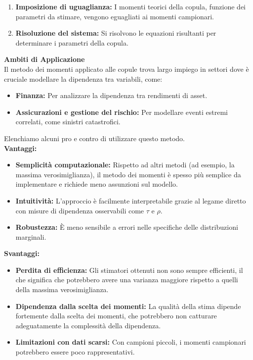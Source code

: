 \documentclass[a4paper,12pt]{article}
\begin{document}
\begin{itemize}
\begin{enumerate}[label=\arabic*.]
		\item \textbf{Imposizione di uguaglianza:} I momenti teorici della copula, funzione dei parametri da stimare, vengono eguagliati ai momenti campionari.
		
		\item \textbf{Risoluzione del sistema:} Si risolvono le equazioni risultanti per determinare i parametri della copula.
	\end{enumerate}
	
	\textbf{Ambiti di Applicazione}\\
	Il metodo dei momenti applicato alle copule trova largo impiego in settori dove è cruciale modellare la dipendenza tra variabili, come:
	\begin{itemize}
		\item \textbf{Finanza:} Per analizzare la dipendenza tra rendimenti di asset.
		\item \textbf{Assicurazioni e gestione del rischio:} Per modellare eventi estremi correlati, come sinistri catastrofici.
	\end{itemize}
	
	Elenchiamo alcuni pro e contro di utilizzare questo metodo.\\
	
	\textbf{Vantaggi:}
	\begin{itemize}
		\item \textbf{Semplicità computazionale:} Rispetto ad altri metodi (ad esempio, la massima verosimiglianza), il metodo dei momenti è spesso più semplice da implementare e richiede meno assunzioni sul modello.
		\item \textbf{Intuitività:} L'approccio è facilmente interpretabile grazie al legame diretto con misure di dipendenza osservabili come \(\tau\) e \(\rho\).
		\item \textbf{Robustezza:} È meno sensibile a errori nelle specifiche delle distribuzioni marginali.
	\end{itemize}
	
	\textbf{Svantaggi:}
	\begin{itemize}
		\item \textbf{Perdita di efficienza:} Gli stimatori ottenuti non sono sempre efficienti, il che significa che potrebbero avere una varianza maggiore rispetto a quelli della massima verosimiglianza.
		\item \textbf{Dipendenza dalla scelta dei momenti:} La qualità della stima dipende fortemente dalla scelta dei momenti, che potrebbero non catturare adeguatamente la complessità della dipendenza.
		\item \textbf{Limitazioni con dati scarsi:} Con campioni piccoli, i momenti campionari potrebbero essere poco rappresentativi.
	\end{itemize}
	

\end{itemize}
\end{document}
